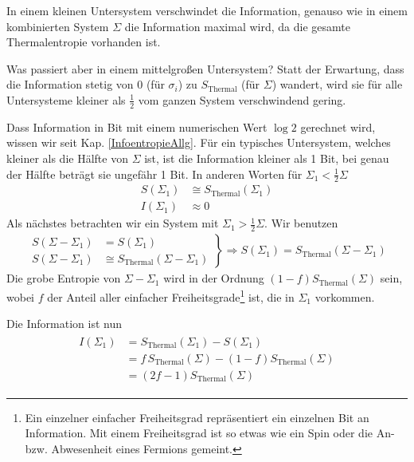 \documentclass[ngerman]{scrartcl}
\begin{document}
In einem kleinen Untersystem verschwindet die Information, genauso wie in einem kombinierten System $\Sigma$ die Information maximal wird, da die gesamte Thermalentropie vorhanden ist.

Was passiert aber in einem mittelgroßen Untersystem? Statt der Erwartung, dass die Information stetig von 0 (für $\sigma_i$) zu $S_{\text{Thermal}}$ (für $\Sigma$) wandert, wird sie für alle Untersysteme kleiner als $\frac{1}{2}$ vom ganzen System verschwindend gering. 

Dass Information in Bit mit einem numerischen Wert $\log 2$ gerechnet wird, wissen wir seit Kap. \ref{InfoentropieAllg}. Für ein typisches Untersystem, welches kleiner als die Hälfte von $\Sigma$ ist, ist die Information kleiner als 1 Bit, bei genau der Hälfte beträgt sie ungefähr 1 Bit. In anderen Worten für $\Sigma_1 < \frac{1}{2} \Sigma$ 
	\begin{align*}
		S(\Sigma_1) &\cong S_{\text{Thermal}}(\Sigma_1) \\
		I(\Sigma_1) &\approx 0
	\end{align*}
Als nächstes betrachten wir ein System mit $\Sigma_1 > \frac{1}{2} \Sigma$. Wir benutzen
	\begin{align}
		\left.
		\begin{aligned}
			S(\Sigma - \Sigma_1) &= S(\Sigma_1) \\
			S(\Sigma - \Sigma_1) &\cong S_{\text{Thermal}} (\Sigma - \Sigma_1)
		\end{aligned}
		\right\}
		\Rightarrow S(\Sigma_1) = S_{\text{Thermal}} (\Sigma - \Sigma_1)
	\end{align}
Die grobe Entropie von $\Sigma - \Sigma_1$ wird in der Ordnung $(1- f) S_{\text{Thermal}}(\Sigma)$ sein, wobei $f$ der Anteil aller einfacher Freiheitsgrade\footnote{Ein einzelner einfacher Freiheitsgrad repräsentiert ein einzelnen Bit an Information. Mit einem Freiheitsgrad ist so etwas wie ein Spin oder die An- bzw. Abwesenheit eines Fermions gemeint.} ist, die in $\Sigma_1$ vorkommen. 

Die Information ist nun
	\begin{align}
		\begin{aligned}
		I (\Sigma_1) &= S_{\text{Thermal}}(\Sigma_1) - S(\Sigma_1) \\
		&= f\, S_{\text{Thermal}} (\Sigma) - (1 - f)S_{\text{Thermal}}(\Sigma) \\
		&= (2f - 1) S_{\text{Thermal}}(\Sigma) 
		\end{aligned}
	\end{align}
\end{document}
